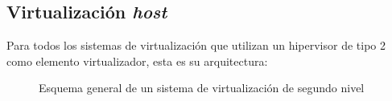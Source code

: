\subsection{Virtualización \emph{host}}
Para todos los sistemas de virtualización que utilizan un hipervisor de tipo 2 como elemento virtualizador, esta es su arquitectura:

\begin{figure}[H]
\begin{center}
\end{center}
\caption[Virtualización \emph{host}]{Esquema general de un sistema de virtualización de segundo nivel}
\end{figure}
